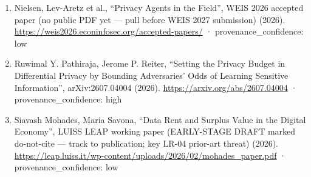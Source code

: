 \documentclass[
  11pt,
]{article}
\begin{document}
\begin{enumerate}
  provenance\_confidence: high
\item
  Nielsen, Lev-Aretz et al., ``Privacy Agents in the Field'', WEIS 2026
  accepted paper (no public PDF yet --- pull before WEIS 2027
  submission) (2026).
  \url{https://weis2026.econinfosec.org/accepted-papers/} ·
  provenance\_confidence: low
\item
  Ruwimal Y. Pathiraja, Jerome P. Reiter, ``Setting the Privacy Budget
  in Differential Privacy by Bounding Adversaries' Odds of Learning
  Sensitive Information'', arXiv:2607.04004 (2026).
  \url{https://arxiv.org/abs/2607.04004} · provenance\_confidence: high
\item
  Siavash Mohades, Maria Savona, ``Data Rent and Surplus Value in the
  Digital Economy'', LUISS LEAP working paper (EARLY-STAGE DRAFT marked
  do-not-cite --- track to publication; key LR-04 prior-art threat)
  (2026).
  \url{https://leap.luiss.it/wp-content/uploads/2026/02/mohades_paper.pdf}
  · provenance\_confidence: low
\end{enumerate}
\end{document}
